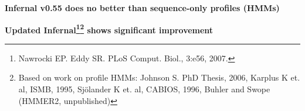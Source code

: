 \documentclass[landscape]{slides}
\begin{document}
\begin{slide}
\begin{center}

\textbf{Infernal v0.55 does no better than sequence-only profiles (HMMs)}
\end{center}
\medskip


\vfill 
\end{slide}
\begin{slide}
\begin{center}

\textbf{Updated Infernal\footnote{Nawrocki EP. Eddy SR. PLoS
    Comput. Biol., 3:e56, 2007.}\footnote{Based on work on profile
    HMMs: Johnson S. PhD Thesis, 2006, Karplus K et. al, ISMB, 1995,
    Sj\"olander K et. al, CABIOS, 1996, Buhler and Swope (HMMER2, unpublished)}
 shows significant improvement}
\end{center}
\medskip


\vfill 
\end{slide}
\end{document}
